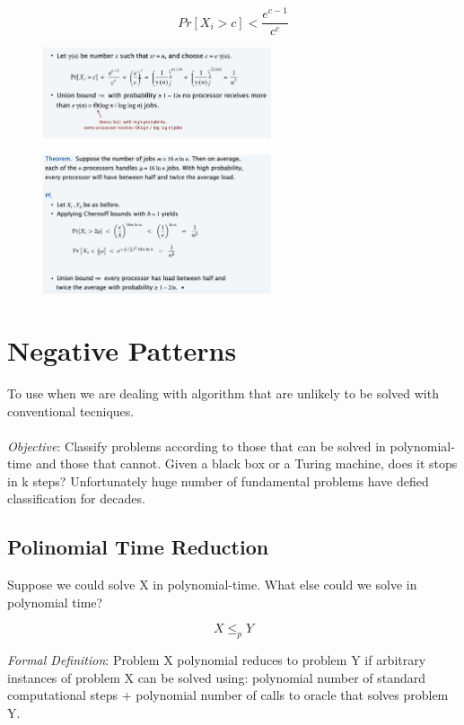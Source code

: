 \documentclass[11pt]{article}
\begin{document}
\[ Pr[X_{i} > c] < \frac{e^{c-1}}{c^{c}}\]

\begin{figure}[H]
		\centering
		\includegraphics[width=0.6\textwidth ]{job}
\end{figure}

\begin{figure}[H]
		\centering
		\includegraphics[width=0.6\textwidth ]{jobTh}
\end{figure}

\clearpage

\section{Negative Patterns}
To use when we are dealing with algorithm that are unlikely to be solved with conventional tecniques.\\\\
\emph{Objective}: Classify problems according to those that can be solved in polynomial-time and those that cannot. Given a black box or a Turing machine, does it stops in k steps? Unfortunately huge number of fundamental problems have defied classification for decades.

\subsection{Polinomial Time Reduction}
Suppose we could solve X in polynomial-time. What else could we solve in polynomial time?

\[ X \leq_{p} Y\]

\emph{Formal Definition}: Problem X polynomial reduces to problem Y if arbitrary instances of problem X can be solved using: polynomial number of standard computational steps + polynomial number of calls to oracle that solves problem Y.\\
\end{document}
